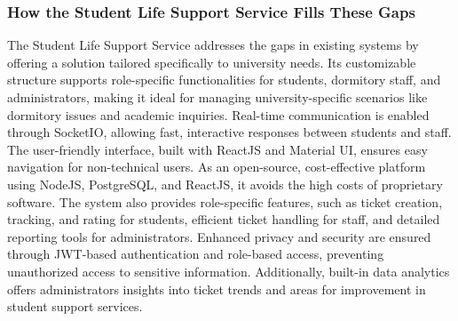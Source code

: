 	\subsubsection{How the Student Life Support Service Fills These Gaps}
	The Student Life Support Service addresses the gaps in existing systems by offering a solution tailored specifically to university needs. Its customizable structure supports role-specific functionalities for students, dormitory staff, and administrators, making it ideal for managing university-specific scenarios like dormitory issues and academic inquiries. Real-time communication is enabled through SocketIO, allowing fast, interactive responses between students and staff. The user-friendly interface, built with ReactJS and Material UI, ensures easy navigation for non-technical users. As an open-source, cost-effective platform using NodeJS, PostgreSQL, and ReactJS, it avoids the high costs of proprietary software. The system also provides role-specific features, such as ticket creation, tracking, and rating for students, efficient ticket handling for staff, and detailed reporting tools for administrators. Enhanced privacy and security are ensured through JWT-based authentication and role-based access, preventing unauthorized access to sensitive information. Additionally, built-in data analytics offers administrators insights into ticket trends and areas for improvement in student support services.
	
	
	
	
	
			